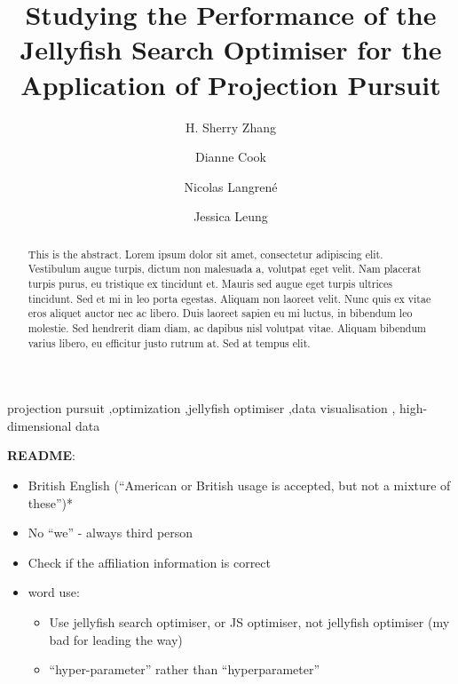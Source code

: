\documentclass[
  number,
  preprint,
  3p]{elsarticle}
\providecommand{\tightlist}{%
  \setlength{\itemsep}{0pt}\setlength{\parskip}{0pt}}\usepackage{longtable,booktabs,array}
\begin{document}
\begin{frontmatter}
\title{Studying the Performance of the Jellyfish Search Optimiser for
the Application of Projection Pursuit}
\author[1]{H. Sherry Zhang%
%
}
\author[2]{Dianne Cook%
%
}
\author[3]{Nicolas Langrené%
%
}
\author[2]{Jessica Leung%
%
}






        
\begin{abstract}
This is the abstract. Lorem ipsum dolor sit amet, consectetur adipiscing
elit. Vestibulum augue turpis, dictum non malesuada a, volutpat eget
velit. Nam placerat turpis purus, eu tristique ex tincidunt et. Mauris
sed augue eget turpis ultrices tincidunt. Sed et mi in leo porta
egestas. Aliquam non laoreet velit. Nunc quis ex vitae eros aliquet
auctor nec ac libero. Duis laoreet sapien eu mi luctus, in bibendum leo
molestie. Sed hendrerit diam diam, ac dapibus nisl volutpat vitae.
Aliquam bibendum varius libero, eu efficitur justo rutrum at. Sed at
tempus elit.
\end{abstract}





\begin{keyword}
    projection pursuit \sep optimization \sep jellyfish
optimiser \sep data visualisation \sep 
    high-dimensional data
\end{keyword}
\end{frontmatter}
    
\textbf{README}:

\begin{itemize}
\item
  British English (``American or British usage is accepted, but not a
  mixture of these'')*
\item
  No ``we'' - always third person
\item
  Check if the affiliation information is correct
\item
  word use:

  \begin{itemize}
  \tightlist
  \item
    Use jellyfish search optimiser, or JS optimiser, not jellyfish
    optimiser (my bad for leading the way)
  \item
    ``hyper-parameter'' rather than ``hyperparameter''
  \end{itemize}
\end{itemize}
\end{document}
